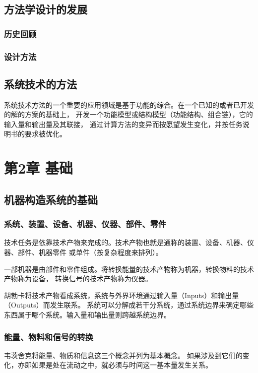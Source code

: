 \documentclass[letterpaper,10pt,english]{sphinxmanual}
\begin{document}
\section{方法学设计的发展}
\label{unit1:id6}

\subsection{历史回顾}
\label{unit1:id7}

\subsection{设计方法}
\label{unit1:id8}

\section{系统技术的方法}
\label{unit1:id9}
系统技术方法的一个重要的应用领域是基于功能的综合。在一个已知的或者已开发的解的方案的基础上，
开发一个功能模型或结构模型（功能结构、组合链），它的输入量和输出量及其联接，
通过计算方法的变异而按愿望发生变化，并按任务说明书的要求被优化。


\chapter{第2章 基础}
\label{unit2::doc}\label{unit2:id1}

\section{机器构造系统的基础}
\label{unit2:id2}

\subsection{系统、装置、设备、机器、仪器、部件、零件}
\label{unit2:id3}
技术任务是依靠技术产物来完成的。技术产物也就是通称的装置、设备、机器、仪器、部件、机器零件
或单件（按复杂程度来排列）。

一部机器是由部件和零件组成。将转换能量的技术产物称为机器，转换物料的技术产物称为设备，
转换信号的技术产物称为仪器。

胡勃卡将技术产物看成系统，系统与外界环境通过输入量（Inputs）和输出量（Outputs）而发生联系。
系统可以分解成若干分系统，通过系统边界来确定哪些东西属于哪个系统。输入量和输出量则跨越系统边界。


\subsection{能量、物料和信号的转换}
\label{unit2:id4}
韦茨舍克将能量、物质和信息这三个概念并列为基本概念。
如果涉及到它们的变化，亦即如果是处在流动之中，就必须与时间这一基本量发生关系。
\end{document}

